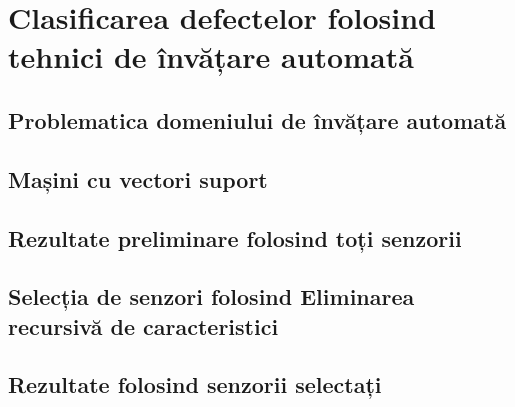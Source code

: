 \chapter{Clasificarea defectelor folosind tehnici de învățare automată}
\label{chap:ml_classification}
\section{Problematica domeniului de învățare automată}

\section{Mașini cu vectori suport}

\section{Rezultate preliminare folosind toți senzorii}

\section{Selecția de senzori folosind Eliminarea recursivă de caracteristici}

\section{Rezultate folosind senzorii selectați}